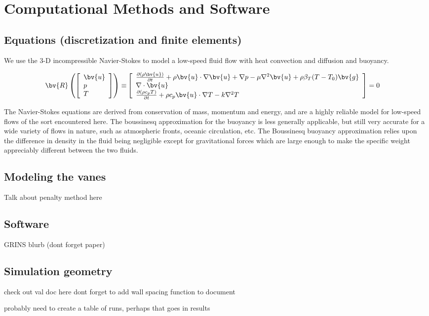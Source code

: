 \section{Computational Methods and Software}
\label{sec:method}

\subsection{Equations (discretization and finite elements)}

We use the 3-D incompressible Navier-Stokes to model a
low-speed fluid flow with heat convection and diffusion and buoyancy. 

\begin{align*}
    \bv{R}\left(\left[
    \begin{array}{l}
        \bv{u} \\
        p \\
        T 
    \end{array}
    \right]\right) \equiv& 
    \left[
    \begin{array}{l}
        \frac{\partial (\rho \bv{u})}{\partial t} + \rho \bv{u} \cdot
    \nabla \bv{u} + \nabla p - \mu \nabla^2 \bv{u} + 
    \rho \beta_T (T - T_0) \bv{g} \\
    \nabla \cdot \bv{u} \\
    \frac{\partial (\rho c_p T)}{\partial t} + \rho c_p \bv{u} \cdot
    \nabla T - k \nabla^2 T
    \end{array} 
    \right] = 0
\end{align*}

The Navier-Stokes equations are derived from conservation of mass,
momentum and energy, and are a highly reliable model for low-speed flows
of the sort encountered here. The boussinesq approximation for the
buoyancy is less generally applicable, but still very accurate for a
wide variety of flows in nature, such as atmospheric fronts, oceanic
circulation, etc. The Boussinesq buoyancy approximation relies upon the
difference in density in the fluid being negligible except for gravitational
forces which are large enough to make the specific weight appreciably different
between the two fluids.


\subsection{Modeling the vanes}

Talk about penalty method here

\subsection{Software}

GRINS blurb (dont forget paper)

\subsection{Simulation geometry}

check out val doc here
dont forget to add wall spacing function to document

probably need to create a table of runs, perhaps that goes in results
